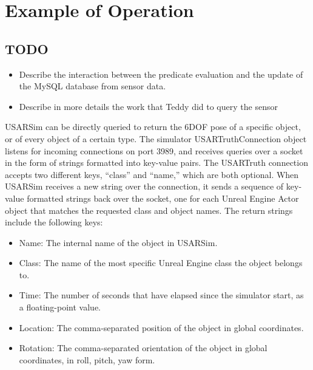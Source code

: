 \section{Example of Operation}
\label{sec:sensor}

\subsection{TODO}
\begin{itemize}
\item Describe the interaction between the predicate evaluation and the update of the MySQL database from sensor data.
\item Describe in more details the work that Teddy did to query the sensor
\end{itemize}


USARSim can be directly queried to return the 6DOF pose of a specific object, or of every object of a certain type. The simulator USARTruthConnection object listens for incoming connections on port 3989, and receives queries over a socket in the form of strings formatted into key-value pairs. The USARTruth connection accepts two different keys, ``class'' and ``name,'' which are both optional. When USARSim receives a new string over the connection, it sends a sequence of key-value formatted strings back over the socket, one for each Unreal Engine Actor object that matches the requested class and object names. The return strings include the following keys:

\begin{itemize}
\item Name: The internal name of the object in USARSim.
\item Class: The name of the most specific Unreal Engine class the object belongs to.
\item Time: The number of seconds that have elapsed since the simulator start, as a floating-point value.
\item Location: The comma-separated position of the object in global coordinates.
\item Rotation: The comma-separated orientation of the object in global coordinates, in roll, pitch, yaw form.
\end{itemize}

